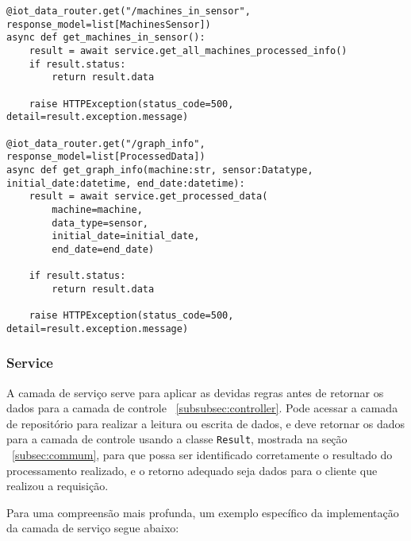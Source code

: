 \begin{verbatim}
@iot_data_router.get("/machines_in_sensor", response_model=list[MachinesSensor])
async def get_machines_in_sensor():
    result = await service.get_all_machines_processed_info()
    if result.status:
        return result.data
    
    raise HTTPException(status_code=500, detail=result.exception.message)

@iot_data_router.get("/graph_info", response_model=list[ProcessedData])
async def get_graph_info(machine:str, sensor:Datatype, initial_date:datetime, end_date:datetime):
    result = await service.get_processed_data(
        machine=machine,
        data_type=sensor,
        initial_date=initial_date,
        end_date=end_date)
    
    if result.status:
        return result.data
    
    raise HTTPException(status_code=500, detail=result.exception.message)
\end{verbatim}

\subsubsection{Service}\label{subsubsec:service}
A camada de serviço serve para aplicar as devidas regras antes de retornar os dados para a camada de controle ~\ref{subsubsec:controller}. Pode acessar a camada de repositório para realizar a leitura ou escrita de dados, e deve retornar os dados para a camada de controle usando a classe \texttt{Result}, mostrada na seção ~\ref{subsec:commum}, para que possa ser identificado corretamente o resultado do processamento realizado, e o retorno adequado seja dados para o cliente que realizou a requisição. 

Para uma compreensão mais profunda, um exemplo específico da implementação da camada de serviço segue abaixo:

